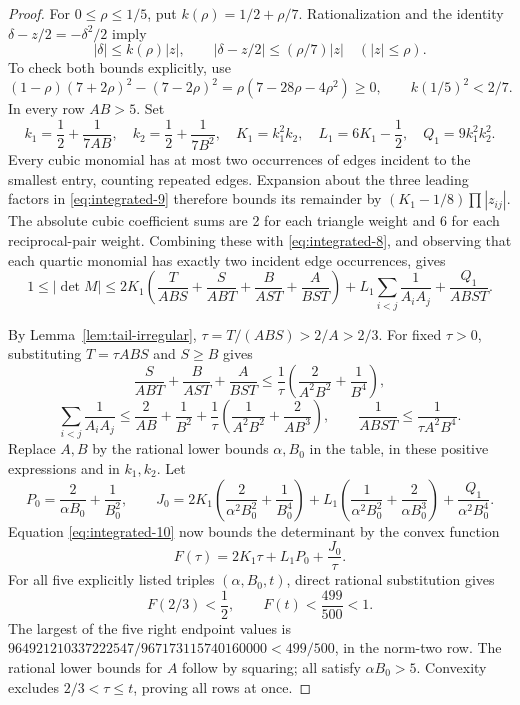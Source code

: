 \documentclass[12pt]{article}
\numberwithin{equation}{section}
\begin{document}
\begin{proof}
For \(0\le\rho\le1/5\), put \(k(\rho)=1/2+\rho/7\).
Rationalization and the identity
\(\delta-z/2=-\delta^2/2\) imply
\begin{equation}\label{eq:integrated-9}
|\delta|\le k(\rho)|z|,\qquad
 |\delta-z/2|\le(\rho/7)|z| \quad (|z|\le\rho).
\end{equation}
To check both bounds explicitly, use
\[
 (1-\rho)(7+2\rho)^2-(7-2\rho)^2
   =\rho(7-28\rho-4\rho^2)\ge0,\qquad
 k(1/5)^2<2/7.
\]
In every row \(AB>5\). Set
\[
 k_1=\frac12+\frac1{7AB},\quad k_2=\frac12+\frac1{7B^2},
 \quad K_1=k_1^2k_2,\quad L_1=6K_1-\frac12,\quad
 Q_1=9k_1^2k_2^2.
\]
Every cubic monomial has at most two occurrences of edges incident to
the smallest entry, counting repeated edges. Expansion about the three
leading factors in \eqref{eq:integrated-9} therefore bounds its remainder by
\((K_1-1/8)\prod|z_{ij}|\).
The absolute cubic coefficient sums are 2 for each triangle weight and 6
for each reciprocal-pair weight. Combining these with \eqref{eq:integrated-8}, and observing
that each quartic monomial has exactly two incident edge occurrences,
gives
\begin{equation}\label{eq:integrated-10}
1\le|\det M|\le
 2K_1\left(\frac{T}{ABS}+\frac{S}{ABT}
                    +\frac{B}{AST}+\frac{A}{BST}\right)
 +L_1\sum_{i<j}\frac1{A_iA_j}+\frac{Q_1}{ABST}.
\end{equation}

By Lemma~\ref{lem:tail-irregular},
\(\tau=T/(ABS)>2/A>2/3\).
For fixed \(\tau>0\), substituting \(T=\tau ABS\) and \(S\ge B\) gives
\[
 \frac{S}{ABT}+\frac{B}{AST}+\frac{A}{BST}
 \le\frac1\tau\left(\frac2{A^2B^2}+\frac1{B^4}\right),
\]
\[
 \sum_{i<j}\frac1{A_iA_j}
 \le\frac2{AB}+\frac1{B^2}
       +\frac1\tau\left(\frac1{A^2B^2}+\frac2{AB^3}\right),
 \qquad
 \frac1{ABST}\le\frac1{\tau A^2B^4}.
\]
Replace \(A,B\) by the rational lower bounds \(\alpha,B_0\) in the
table, in these positive expressions and in \(k_1,k_2\). Let
\[
 P_0=\frac2{\alpha B_0}+\frac1{B_0^2},\qquad
 J_0=2K_1\left(\frac2{\alpha^2B_0^2}+\frac1{B_0^4}\right)
 +L_1\left(\frac1{\alpha^2B_0^2}+\frac2{\alpha B_0^3}\right)
 +\frac{Q_1}{\alpha^2B_0^4}.
\]
Equation \eqref{eq:integrated-10} now bounds the determinant by the convex function
\[
 F(\tau)=2K_1\tau+L_1P_0+\frac{J_0}{\tau}.
\]
For all five explicitly listed triples \((\alpha,B_0,t)\), direct rational
substitution gives
\[
 F(2/3)<\frac12,\qquad F(t)<\frac{499}{500}<1.
\]
The largest of the five right endpoint values is
\(964921210337222547/967173115740160000<499/500\),
in the norm-two row. The rational lower bounds for \(A\) follow by
squaring; all satisfy \(\alpha B_0>5\).
Convexity excludes \(2/3<\tau\le t\), proving all rows at once.
\end{proof}
\end{document}
